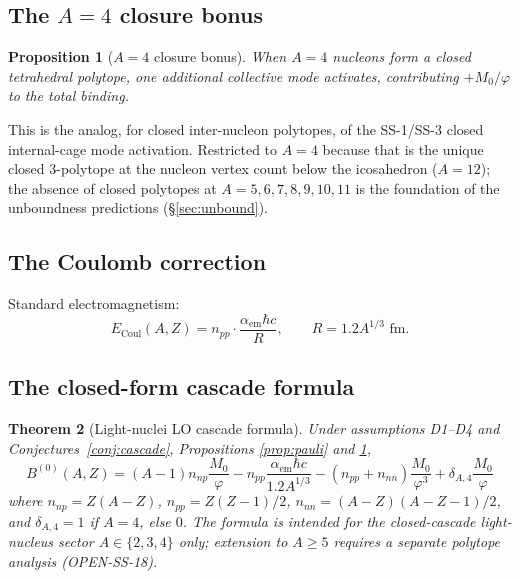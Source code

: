 \documentclass[11pt,letterpaper]{article}
\newtheorem{theorem}{Theorem}[section]
\newtheorem{proposition}[theorem]{Proposition}
\newcommand{\phig}{\varphi}
\newcommand{\Mzero}{M_0}
\newcommand{\npnp}{n_{np}}
\newcommand{\npp}{n_{pp}}
\newcommand{\nnn}{n_{nn}}
\begin{document}
\subsection{The $A = 4$ closure bonus}

\begin{proposition}[$A = 4$ closure bonus]
\label{prop:closure}
When $A = 4$ nucleons form a closed tetrahedral polytope, one additional collective mode activates, contributing $+\Mzero/\phig$ to the total binding.
\end{proposition}

This is the analog, for closed inter-nucleon polytopes, of the SS-1/SS-3 closed internal-cage mode activation. Restricted to $A = 4$ because that is the unique closed 3-polytope at the nucleon vertex count below the icosahedron ($A = 12$); the absence of closed polytopes at $A = 5, 6, 7, 8, 9, 10, 11$ is the foundation of the unboundness predictions (§\ref{sec:unbound}).

\subsection{The Coulomb correction}

Standard electromagnetism:
\begin{equation}
E_{\mathrm{Coul}}(A, Z) = \npp \cdot \frac{\alpha_{\mathrm{em}} \hbar c}{R}, \qquad R = 1.2 A^{1/3} \text{ fm}.
\label{eq:coulomb}
\end{equation}

\subsection{The closed-form cascade formula}

\begin{theorem}[Light-nuclei LO cascade formula]
\label{thm:cascade}
Under assumptions D1--D4 and Conjectures~\ref{conj:cascade}, Propositions \ref{prop:pauli} and \ref{prop:closure},
\begin{equation}
\boxed{B^{(0)}(A, Z) = (A-1) \npnp \frac{\Mzero}{\phig} - \npp \frac{\alpha_{\mathrm{em}}\hbar c}{1.2 A^{1/3}} - (\npp + \nnn) \frac{\Mzero}{\phig^3} + \delta_{A,4} \frac{\Mzero}{\phig}}
\label{eq:cascade}
\end{equation}
where $\npnp = Z(A-Z)$, $\npp = Z(Z-1)/2$, $\nnn = (A-Z)(A-Z-1)/2$, and $\delta_{A,4} = 1$ if $A = 4$, else $0$. The formula is intended for the closed-cascade light-nucleus sector $A \in \{2, 3, 4\}$ only; extension to $A \geq 5$ requires a separate polytope analysis (OPEN-SS-18).
\end{theorem}
\end{document}
